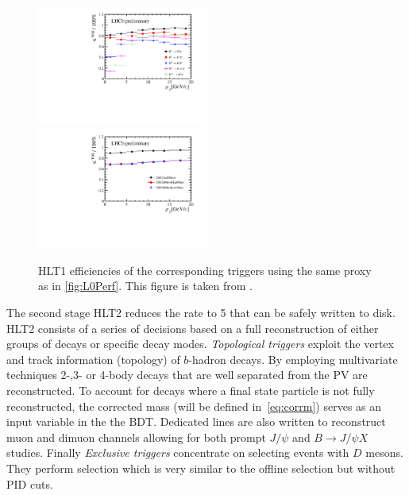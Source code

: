 \begin{figure}[!h]
	\centering
	\includegraphics[width = 0.5\textwidth]{figs/detector/Fig5_Hlt1TrackAllL0_PT.pdf}%
	\includegraphics[width = 0.5\textwidth]{figs/detector/Fig3_Hlt1MuonEff_PT.pdf}%
	\caption{ \Gls{HLT1} efficiencies of the corresponding triggers using the same proxy as in \autoref{fig:L0Perf}.  This figure is taken from \cite{Albrecht:2013fba}. }  
	\label{fig:Hlt1Perf}
\end{figure}

The second stage \Gls{HLT2} reduces the rate to 5 \khz that can be safely written to disk. \Gls{HLT2} consists of a series of decisions based on a full reconstruction of either groups of decays or specific decay modes. \textit{Topological triggers} exploit the vertex and track information (topology) of $b$-hadron decays. By employing multivariate techniques 2-,3- or 4-body decays that are well separated from the \Gls{PV} are reconstructed. To account for decays where a final state particle is not fully reconstructed, the corrected mass (will be defined in~\autoref{eq:corrm}) serves as an input variable in the the \Gls{BDT}. Dedicated lines are also written to reconstruct muon and dimuon channels allowing for both prompt $J/\psi$ and $B\rightarrow J/\psi X$ studies. Finally \textit{Exclusive triggers} concentrate on selecting events with $D$ mesons. They perform selection which is very similar to the offline selection but without \Gls{PID} cuts.%



